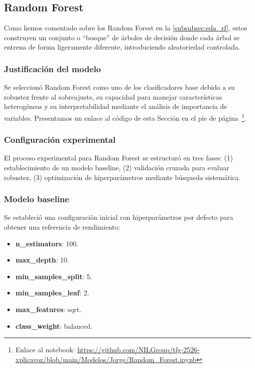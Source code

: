 \subsection{Random Forest}
\label{subsubsec:mod_rf}

Como hemos comentado sobre los Random Forest en la \autoref{subsubsec:eda_rf}, estos construyen un conjunto o ``bosque'' de árboles de decisión donde cada árbol se entrena de forma ligeramente diferente, introduciendo aleatoriedad controlada.

\subsubsection*{Justificación del modelo}

Se seleccionó Random Forest como uno de los clasificadores base debido a su robustez frente al sobreajuste, su capacidad para manejar características heterogéneas y su interpretabilidad mediante el análisis de importancia de variables. Presentamos un enlace al código de esta Sección en el pie de página~\footnote{Enlace al notebook: \url{https://github.com/NILGroup/tfg-2526-xplicavoz/blob/main/Modelos/Jorge/Random_Forest.ipynb}}.

\subsubsection*{Configuración experimental}

El proceso experimental para Random Forest se estructuró en tres fases: (1) establecimiento de un modelo baseline, (2) validación cruzada para evaluar robustez, (3) optimización de hiperparámetros mediante búsqueda sistemática.

\subsubsection*{Modelo baseline}
Se estableció una configuración inicial con hiperparámetros por defecto para obtener una referencia de rendimiento:

\begin{itemize}
	\item \textbf{n\_estimators}: 100.
	\item \textbf{max\_depth}: 10.
	\item \textbf{min\_samples\_split}: 5.
	\item \textbf{min\_samples\_leaf}: 2.
	\item \textbf{max\_features}: sqrt.
	\item \textbf{class\_weight}: balanced.
\end{itemize}

